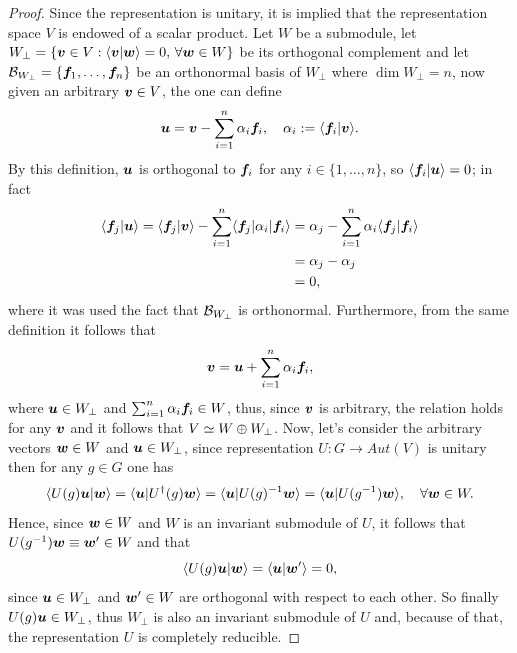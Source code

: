 \begin{proof}
    Since the representation is unitary, it is implied that the representation space $V$ is endowed of a scalar product. Let $W$ be a submodule, let $W_\perp = \{\bm{v} \in V : \langle \bm{v} | \bm{w} \rangle = 0,\,\forall \bm{w} \in W\}$ be its orthogonal complement and let $\mathcal{B}_{W_\perp} = \{\bm{f}_1,\dots,\bm{f}_n\}$ be an orthonormal basis of $W_\perp$ where $\dim W_\perp = n$, now given an arbitrary $\bm{v} \in V$, the one can define
    \begin{equation}
        \bm{u} = \bm{v} - \sum_{i=1}^n\alpha_i\bm{f}_i,\quad \alpha_i := \langle \bm{f}_i | \bm{v} \rangle.
    \end{equation}
    By this definition, $\bm{u}$ is orthogonal to $\bm{f}_i$ for any $i \in \{1,\dots,n\}$, so $\langle \bm{f}_i | \bm{u} \rangle = 0$; in fact
    \begin{equation}
        \begin{split}
            \langle \bm{f}_j | \bm{u} \rangle = \langle \bm{f}_j | \bm{v} \rangle - \sum_{i=1}^n\langle \bm{f}_j | \alpha_i | \bm{f}_i \rangle &= \alpha_j - \sum_{i=1}^n\alpha_i\langle \bm{f}_j | \bm{f}_i \rangle \\
            &= \alpha_j - \alpha_j \\
            &= 0,
        \end{split}
    \end{equation}
    where it was used the fact that $\mathcal{B}_{W_\perp}$ is orthonormal. Furthermore, from the same definition it follows that 
    \begin{equation}
        \bm{v} = \bm{u} + \sum_{i=1}^n\alpha_i\bm{f}_i,
    \end{equation}
    where $\bm{u} \in W_\perp$ and $\sum_{i=1}^n\alpha_i\bm{f}_i \in W$, thus, since $\bm{v}$ is arbitrary, the relation holds for any $\bm{v}$ and it follows that $V \simeq W \oplus W_\perp$. Now, let's consider the arbitrary vectors $\bm{w} \in W$ and $\bm{u} \in W_\perp$, since representation $U : G \to Aut(V)$ is unitary then for any $g \in G$ one has
    \begin{equation}
        \langle U(g)\bm{u} | \bm{w} \rangle = \langle \bm{u} | U^\dagger(g)\bm{w} \rangle = \langle \bm{u} | U(g)^{-1}\bm{w} \rangle = \langle \bm{u} | U(g^{-1})\bm{w} \rangle,\quad \forall \bm{w} \in W.
    \end{equation}
    Hence, since $\bm{w} \in W$ and $W$ is an invariant submodule of $U$, it follows that $U(g^{-1})\bm{w} \equiv \bm{w}' \in W$ and that
    \begin{equation}
        \langle U(g)\bm{u} | \bm{w} \rangle = \langle \bm{u} | \bm{w}' \rangle = 0,
    \end{equation}
    since $\bm{u} \in W_\perp$ and $\bm{w}' \in W$ are orthogonal with respect to each other. So finally $U(g)\bm{u} \in W_\perp$, thus $W_\perp$ is also an invariant submodule of $U$ and, because of that, the representation $U$ is completely reducible.
\end{proof}
